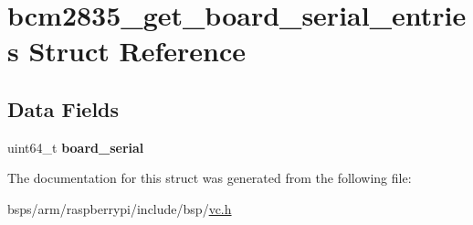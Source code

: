 \hypertarget{structbcm2835__get__board__serial__entries}{}\section{bcm2835\+\_\+get\+\_\+board\+\_\+serial\+\_\+entries Struct Reference}
\label{structbcm2835__get__board__serial__entries}
\subsection*{Data Fields}
\begin{DoxyCompactItemize}
\item 
\mbox{\label{structbcm2835__get__board__serial__entries_a0504a3c633a214f45eb86d414373b35a}} 
uint64\+\_\+t {\bfseries board\+\_\+serial}
\end{DoxyCompactItemize}


The documentation for this struct was generated from the following file\+:\begin{DoxyCompactItemize}
\item 
bsps/arm/raspberrypi/include/bsp/\mbox{\hyperlink{vc_8h}{vc.\+h}}\end{DoxyCompactItemize}
